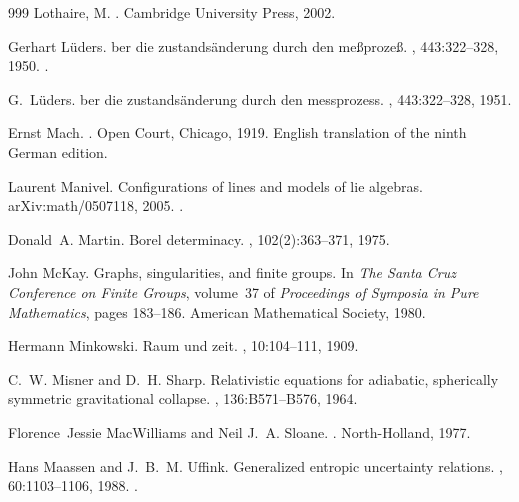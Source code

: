 \begin{thebibliography}{999}
{Lothaire, M.}
.
\newblock Cambridge University Press, 2002.

Gerhart L{\"u}ders.
ber die zustands{\"a}nderung durch den me{\ss}proze{\ss}.
, 443:322--328, 1950.
\newblock \href {https://doi.org/10.1002/andp.19504430510}
  {}.

G.~L{\"u}ders.
ber die zustands{\"a}nderung durch den messprozess.
, 443:322--328, 1951.

Ernst Mach.
.
\newblock Open Court, Chicago, 1919.
\newblock English translation of the ninth German edition.

Laurent Manivel.
\newblock Configurations of lines and models of lie algebras.
\newblock arXiv:math/0507118, 2005.
\newblock \href {https://arxiv.org/abs/math/0507118}
  {}.

Donald~A. Martin.
\newblock Borel determinacy.
, 102(2):363--371, 1975.

John McKay.
\newblock Graphs, singularities, and finite groups.
\newblock In {\em The Santa Cruz Conference on Finite Groups}, volume~37 of
  {\em Proceedings of Symposia in Pure Mathematics}, pages 183--186. American
  Mathematical Society, 1980.

Hermann Minkowski.
\newblock Raum und zeit.
, 10:104--111, 1909.

C.~W. Misner and D.~H. Sharp.
\newblock Relativistic equations for adiabatic, spherically symmetric
  gravitational collapse.
, 136:B571--B576, 1964.

Florence~Jessie MacWilliams and Neil J.~A. Sloane.
.
\newblock North-Holland, 1977.

Hans Maassen and J.~B.~M. Uffink.
\newblock Generalized entropic uncertainty relations.
, 60:1103--1106, 1988.
\newblock \href {https://doi.org/10.1103/PhysRevLett.60.1103}
  {}.


\end{thebibliography}
